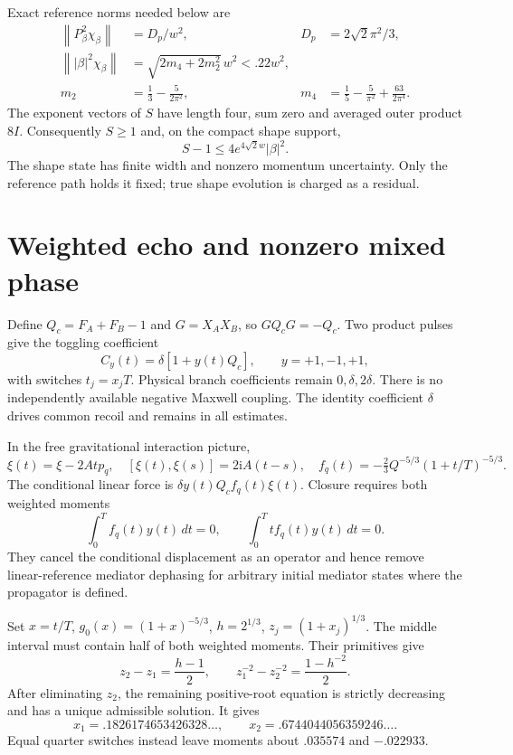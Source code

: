 \documentclass[11pt]{article}
\newcommand{\ii}{\mathrm{i}}
\newcommand{\norm}[1]{\left\lVert#1\right\rVert}
\begin{document}
Exact reference norms needed below are
\begin{align}
 \norm{P_\beta^2\chi_\beta}&=D_p/w^2,&D_p&=2\sqrt2\pi^2/3,\label{eq:shapemom}\\
 \norm{|\beta|^2\chi_\beta}&=\sqrt{2m_4+2m_2^2}\,w^2<.22w^2,\nonumber\\
 m_2&=\tfrac13-\tfrac5{2\pi^2},&
 m_4&=\tfrac15-\tfrac5{\pi^2}+\tfrac{63}{2\pi^4}.
\end{align}
The exponent vectors of $S$ have length four, sum zero and averaged outer product $8I$.
Consequently $S\ge1$ and, on the compact shape support,
\begin{equation}
 S-1\le4e^{4\sqrt2w}|\beta|^2.\label{eq:hessian}
\end{equation}
The shape state has finite width and nonzero momentum uncertainty.
Only the reference path holds it fixed; true shape evolution is charged as a residual.

\section{Weighted echo and nonzero mixed phase}\label{sec:echo}

Define $Q_c=F_A+F_B-1$ and $G=X_AX_B$, so $GQ_cG=-Q_c$.
Two product pulses give the toggling coefficient
\begin{equation}
 C_y(t)=\delta[1+y(t)Q_c],\qquad y=+1,-1,+1,\label{eq:Ctoggle}
\end{equation}
with switches $t_j=x_jT$.
Physical branch coefficients remain $0,\delta,2\delta$.
There is no independently available negative Maxwell coupling.
The identity coefficient $\delta$ drives common recoil and remains in all estimates.

In the free gravitational interaction picture,
\begin{equation}
 \xi(t)=\xi-2Atp_q,\quad [\xi(t),\xi(s)]=2\ii A(t-s),\quad
 f_q(t)=-\tfrac23Q^{-5/3}(1+t/T)^{-5/3}.\label{eq:linearforce}
\end{equation}
The conditional linear force is $\delta y(t)Q_cf_q(t)\xi(t)$.
Closure requires both weighted moments
\begin{equation}
 \int_0^Tf_q(t)y(t)\,dt=0,\qquad
 \int_0^Ttf_q(t)y(t)\,dt=0.\label{eq:closure}
\end{equation}
They cancel the conditional displacement as an operator and hence remove linear-reference mediator dephasing for arbitrary initial mediator states where the propagator is defined.

Set $x=t/T$, $g_0(x)=(1+x)^{-5/3}$, $h=2^{1/3}$, $z_j=(1+x_j)^{1/3}$.
The middle interval must contain half of both weighted moments.
Their primitives give
\begin{equation}
 z_2-z_1=\frac{h-1}{2},\qquad
 z_1^{-2}-z_2^{-2}=\frac{1-h^{-2}}2.\label{eq:switchroots}
\end{equation}
After eliminating $z_2$, the remaining positive-root equation is strictly decreasing and has a unique admissible solution.
It gives
\begin{equation}
 x_1=.1826174653426328\ldots,\qquad x_2=.6744044056359246\ldots.\label{eq:switches}
\end{equation}
Equal quarter switches instead leave moments about $.035574$ and $-.022933$.
\end{document}
